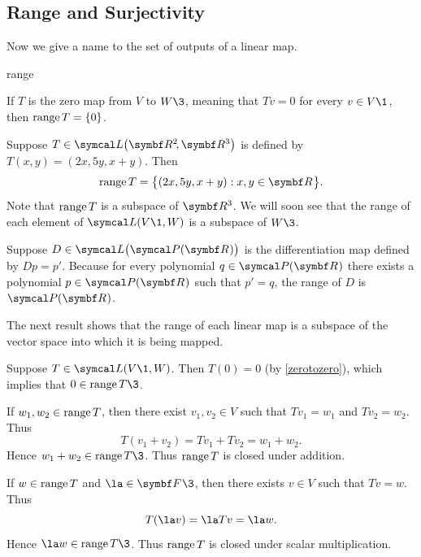 \subsection{Range and Surjectivity}

Now we give a name to the set of outputs of a linear map.


\begin{example}[range]{range}
{\begin{Itemize}
\item
If $T$ is the zero map from $V$ to $W\3$, meaning that $Tv=0$ for every $v \in V\1$, then $\operatorname{range} T = \{0\}$.
\item
Suppose $T \in \L\paren[\big]{\RR2, \R3}$ is defined by $T(x, y) = (2x, 5y, x + y)$. Then
\[
\ran T = \br[\big]{ (2x, 5y, x + y ): x, y \in \R{} }.
\]
Note that $\operatorname{range} T$ is a subspace of $\R3$. We will soon see that the range of each element of $\L(V\1,W)$ is a subspace of $W\3$.
\item
Suppose $D\in \L\bigl(\P(\R{})\bigr)$ is the differentiation
map defined by $Dp = p'\!$. Because for every polynomial $q \in \P(\R{})$
there exists a polynomial $p \in \P(\R{})$ such that $p' = q$, the range of $D$ is $\P(\R{})$.
\end{Itemize}}
\exampleitemend
\end{example}

The next result shows that the range of each linear map is a subspace of
the vector space into which it is being mapped.


\proof
Suppose $T \in \L(V\1,W)$. Then $T(0) = 0$ (by \ref{zerotozero}), which implies
that $0 \in \ran T\3$.

If $w_1, w_2 \in \operatorname{range} T$, then there exist $v_1, v_2 \in V$ such that
$Tv_1 = w_1$ and $Tv_2 = w_2$.  Thus
\[
T(v_1 + v_2) = Tv_1 + Tv_2 = w_1 + w_2.
\]
Hence $w_1 + w_2 \in \ran T\3$. Thus $\operatorname{range} T$ is closed under
addition.

If $w \in \operatorname{range} T$ and $\la \in \F{}\3$, then there exists $v \in V$ such that $Tv = w$. Thus
\[
T(\la v) = \la Tv = \la w.
\]
Hence $\la w \in \ran T\3$.  Thus $\operatorname{range} T$ is closed under scalar
multiplication.

